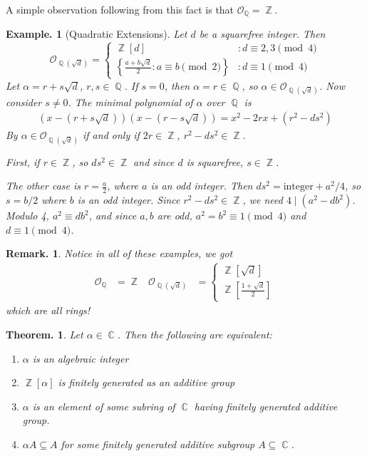 \documentclass[11pt, a4paper]{memoir}
\DeclareMathOperator{\Q}{{\mathbb{Q}}}
\DeclareMathOperator{\Z}{{\mathbb{Z}}}
\DeclareMathOperator{\C}{{\mathbb{C}}}
\theoremstyle{change}
\newtheorem{theorem}{Theorem.}[section]
\theoremstyle{plain}
\theoremstyle{nonumberplain}
\newtheorem{example}{Example.}
\newtheorem{remark}{Remark.}
\numberwithin{equation}{section}
\begin{document}
A simple observation following from this fact is that $\mathcal{O}_{\Q}=\Z$.
\begin{example}[Quadratic Extensions]
    Let $d$ be a squarefree integer.
    Then
    \begin{equation*}
        \mathcal{O}_{\Q(\sqrt{d})}=\begin{cases}
            \Z[d] &:d\equiv 2,3\pmod{4}\\
            \left\{\frac{a+b\sqrt{d}}{2}: a\equiv b\pmod{2}\right\} &:d\equiv 1\pmod{4}
        \end{cases}
    \end{equation*}
    Let $\alpha=r+s\sqrt{d}$, $r,s\in\Q$.
    If $s=0$, then $\alpha=r\in\Q$, so $\alpha\in\mathcal{O}_{\Q(\sqrt{d})}$.
    Now consider $s\neq 0$.
    The minimal polynomial of $\alpha$ over $\Q$ is
    \begin{align*}
        \left(x-(r+s\sqrt{d})\right)\left(x-(r-s\sqrt{d})\right) = x^2-2rx+(r^2-ds^2)
    \end{align*}
    By $\alpha\in\mathcal{O}_{\Q(\sqrt{d})}$ if and only if $2r\in\Z$, $r^2-ds^2\in\Z$.

    First, if $r\in\Z$, so $ds^2\in\Z$ and since $d$ is squarefree, $s\in\Z$.

    The other case is $r=\frac{a}{2}$, where $a$ is an odd integer.
    Then $ds^2=\text{integer}+a^2/4$, so $s=b/2$ where $b$ is an odd integer.
    Since $r^2-ds^2\in\Z$, we need $4\mid(a^2-db^2)$.
    Modulo 4, $a^2\equiv db^2$, and since $a,b$ are odd, $a^2=b^2\equiv 1\pmod{4}$ and $d\equiv 1\pmod{4}$.
\end{example}
\begin{remark}
    Notice in all of these examples, we got
    \begin{align*}
        \mathcal{O}_{\Q}&=\Z&\mathcal{O}_{\Q(\sqrt{d})}&=\begin{cases}
            \Z[\sqrt{d}]\\\Z\left[\frac{1+\sqrt{d}}{2}\right]
        \end{cases}
    \end{align*}
    which are all rings!
\end{remark}
\begin{theorem}\label{thm:algint}
    Let $\alpha\in\C$.
    Then the following are equivalent:
    \begin{enumerate}[nl,r]
        \item $\alpha$ is an algebraic integer
        \item $\Z[\alpha]$ is finitely generated as an additive group
        \item $\alpha$ is an element of some subring of $\C$ having finitely generated additive group.
        \item $\alpha A\subseteq A$ for some finitely generated additive subgroup $A\subseteq\C$.
    \end{enumerate}
\end{theorem}
\end{document}
